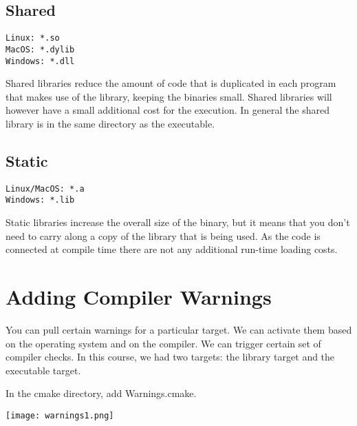 \subsection{Shared}

\begin{verbatim}
Linux: *.so
MacOS: *.dylib
Windows: *.dll
\end{verbatim}

Shared libraries reduce the amount of code that is duplicated in each program that makes use of the library, keeping the binaries small.
Shared libraries will however have a small additional cost for the execution.
In general the shared library is in the same directory as the executable.

\subsection{Static}

\begin{verbatim}
Linux/MacOS: *.a
Windows: *.lib
\end{verbatim}

Static libraries increase the overall size of the binary, but it means that you don't need to carry along a copy of the library that is being used.
As the code is connected at compile time there are not any additional run-time loading costs.

\section{Adding Compiler Warnings}

You can pull certain warnings for a particular target. We can activate them based on the operating system and on the compiler.
We can trigger certain set of compiler checks. In this course, we had two targets: the library target and the executable target.

In the cmake directory, add Warnings.cmake. 


\begin{center}
    \texttt{[image: warnings1.png]}
\end{center}

